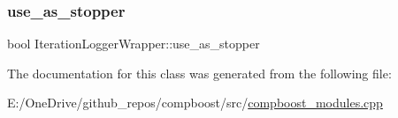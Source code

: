 \subsubsection{\texorpdfstring{use\+\_\+as\+\_\+stopper}{use\_as\_stopper}}
{\footnotesize\ttfamily bool Iteration\+Logger\+Wrapper\+::use\+\_\+as\+\_\+stopper\hspace{0.3cm}{\ttfamily [private]}}



The documentation for this class was generated from the following file\+:\begin{DoxyCompactItemize}
\item 
E\+:/\+One\+Drive/github\+\_\+repos/compboost/src/\mbox{\hyperlink{compboost__modules_8cpp}{compboost\+\_\+modules.\+cpp}}\end{DoxyCompactItemize}

